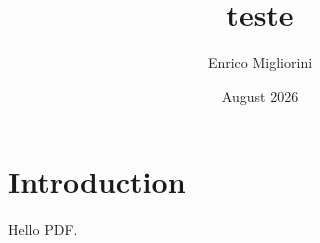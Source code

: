 \documentclass{article}
\title{teste}
\author{Enrico Migliorini}
\date{August 2026}
\begin{document}
\maketitle
\section{Introduction}
Hello PDF.
\end{document}
